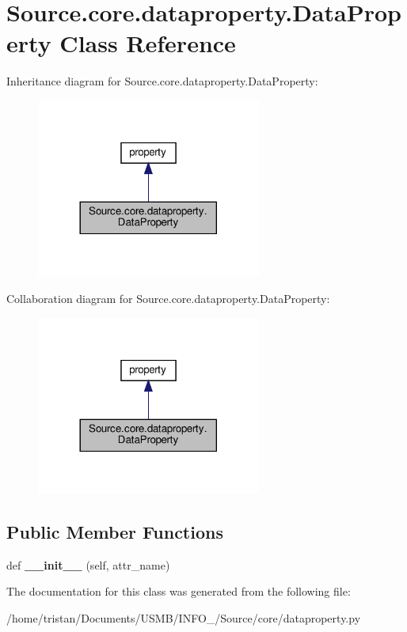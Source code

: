 \hypertarget{classSource_1_1core_1_1dataproperty_1_1DataProperty}{}\section{Source.\+core.\+dataproperty.\+Data\+Property Class Reference}
\label{classSource_1_1core_1_1dataproperty_1_1DataProperty}


Inheritance diagram for Source.\+core.\+dataproperty.\+Data\+Property\+:\nopagebreak
\begin{figure}[H]
\begin{center}
\leavevmode
\includegraphics[width=209pt]{classSource_1_1core_1_1dataproperty_1_1DataProperty__inherit__graph}
\end{center}
\end{figure}


Collaboration diagram for Source.\+core.\+dataproperty.\+Data\+Property\+:\nopagebreak
\begin{figure}[H]
\begin{center}
\leavevmode
\includegraphics[width=209pt]{classSource_1_1core_1_1dataproperty_1_1DataProperty__coll__graph}
\end{center}
\end{figure}
\subsection*{Public Member Functions}
\begin{DoxyCompactItemize}
\item 
\mbox{\label{classSource_1_1core_1_1dataproperty_1_1DataProperty_ad12c5230c3e926e3232ea586a99625e4}} 
def {\bfseries \+\_\+\+\_\+init\+\_\+\+\_\+} (self, attr\+\_\+name)
\end{DoxyCompactItemize}


The documentation for this class was generated from the following file\+:\begin{DoxyCompactItemize}
\item 
/home/tristan/\+Documents/\+U\+S\+M\+B/\+I\+N\+F\+O\+\_/\+Source/core/dataproperty.\+py\end{DoxyCompactItemize}
